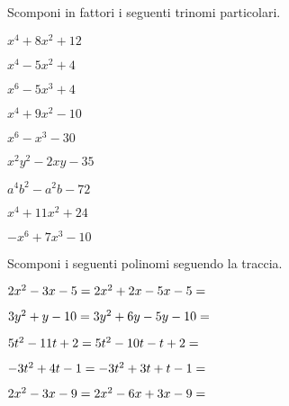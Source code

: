 \begin{esercizio}
\label{ese:17.5}
Scomponi in fattori i seguenti trinomi particolari.
\begin{htmulticols}{3}
\begin{enumeratea}
\item \(x^{4}+8x^{2}+12\)
\item \(x^{4}-5x^{2}+4\)
\item \(x^{6}-5x^{3}+4\)
\item \(x^{4}+9x^{2}-10\)
\item \(x^{6}-x^{3}-30\)
\item \(x^{2}y^{2}-2xy-35\)
\item \(a^{4}b^{2}-a^{2}b-72\)
\item \(x^{4}+11x^{2}+24\)
\item \(-x^{6}+7x^{3}-10\)
\end{enumeratea}
\end{htmulticols}
\end{esercizio}

\begin{esercizio}[*]
\label{ese:17.9}
Scomponi i seguenti polinomi seguendo la traccia.
\begin{enumeratea}
\item \(2x^{{2}}-3x-5=2x^{2}+2x-5x-5=\dotfill\) 
\item \(3y^{{2}}+y-10 = 3y^{2}+6y-5y-10 =\dotfill\) 
\item \(5t^{{2}}-11t+2 = 5t^{2}-10t-t+2 =\dotfill\) 
\item \(-3t^{{2}}+4t-1= -3t^{2}+3t+t-1 = \dotfill\) 
\item \(2x^{2}-3x-9= 2x^{2}-6x+3x-9 = \dotfill\) 
\end{enumeratea}
\end{esercizio}

